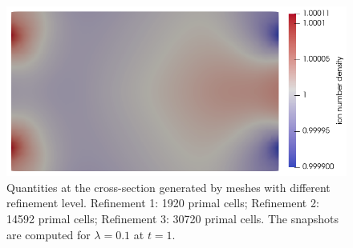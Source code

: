\documentclass{article}
\begin{document}
\begin{figure}
    \includegraphics[scale=0.27]{clip_ni_T-1_lambda-1e-1_32-3-4.png}
    \caption{Quantities at the cross-section generated by meshes with different refinement level. Refinement 1: 1920 primal cells; Refinement 2: 14592 primal cells; Refinement 3: 30720 primal cells. The snapshots are computed for $\lambda = 0.1$ at $t = 1$.}
    \label{fig:grid_study_3d_clip_lambda-1e-1}
\end{figure}
\end{document}

